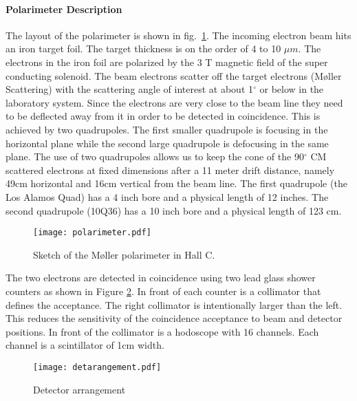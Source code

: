 {\paragraph{Polarimeter Description}
The layout of the polarimeter is shown in fig.~\ref{polscetch}.
The incoming electron beam hits an iron target foil. The target thickness
is on the order of 4 to 10 $\mu m$. The electrons in the iron foil
are polarized by the 3 T magnetic field of the super conducting solenoid.
The beam electrons scatter off 
the target electrons (M\o ller Scattering) 
with the scattering angle of interest at about
1$^{\circ}$ or below in the laboratory system. Since the electrons
are very close to the beam line they need to be deflected away from
it in order to be detected in coincidence. This is achieved by
two quadrupoles. The first smaller quadrupole is focusing in the
horizontal plane  while the
second large quadrupole is defocusing in the same plane. The use of two quadrupoles
allows us to keep the cone of the 90$^{\circ}$ CM scattered electrons 
at fixed dimensions after a 11 meter drift distance, namely
49cm horizontal and 16cm vertical from the beam line.
The first quadrupole (the Los Alamos Quad) has a 4 inch bore and a
physical length of 12 inches. The second quadrupole (10Q36) has a 10
inch bore and a physical length of 123 cm.
\begin{figure}[htp]
\begin{center}
\texttt{[image: polarimeter.pdf]}
\caption{Sketch of the M\o ller polarimeter in Hall C.\label{polscetch}}
\end{center}
\end{figure}
The two electrons are detected in coincidence using two lead glass 
shower counters as shown in Figure \ref{detarr}. In front of each counter is a collimator that defines
the acceptance. The right collimator is intentionally larger
than the left. This reduces the sensitivity of the coincidence 
acceptance to beam and detector positions. In front of the collimator
is a hodoscope with 16 channels. Each channel is a scintillator of 1cm
width.
\begin{figure}
\texttt{[image: detarangement.pdf]}
\begin{center}
\parbox{10cm}{
\caption{Detector arrangement}\label{detarr}}
\end{center}
\end{figure}

}
